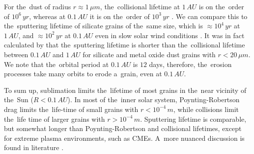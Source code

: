 For the~dust of radius $r \approx 1 \, \si{\mu m}$, the~collisional lifetime at $1\,\si{AU}$ is on the~order of $10^6 \, \si{yr}$, whereas at $0.1\,\si{AU}$ it is on the~order of $10^3 \, \si{yr}$ \citep{grun1985collisional}. We can compare this to the~sputtering lifetime of silicate grains of the~same size, which is $\approx 10^4 \, \si{yr}$ at $1\,\si{AU}$, and $\approx 10^2 \, \si{yr}$ at $0.1\,\si{AU}$ even in slow solar wind conditions \citep{klepper2021influence}. It was in fact calculated by \citet{klepper2021influence} that the~sputtering lifetime is shorter than the~collisional lifetime between $0.1 \, \si{AU}$ and $1 \, \si{AU}$ for silicate and metal oxide dust grains with $r<20 \, \si{\mu m}$. We note that the~orbital period at $0.1\,\si{AU}$ is $12$ days, therefore, the~erosion processes take many orbits to erode a~grain, even at $0.1\,\si{AU}$. 

To sum up, sublimation limits the~lifetime of most grains in the~near vicinity of the~Sun ($R<0.1 \, \si{AU}$). In most of the~inner solar system, Poynting-Robertson drag limits the~life-time of small grains with $r<10^{-4} \, \si{m}$, while collisions limit the~life time of larger grains with $r>10^{-4} \, \si{m}$. Sputtering lifetime is comparable, but somewhat longer than Poynting-Robertson and collisional lifetimes, except for extreme plasma environments, such as CMEs. A~more nuanced discussion is found in literature \citep{klepper2021influence,baumann2020dust,grun1985collisional,whipple1967maintaining,myrvang2018temperature}.  
